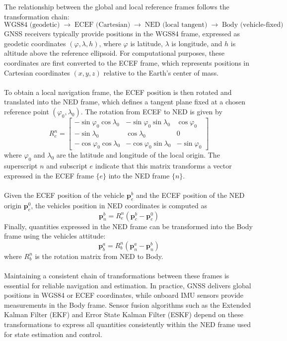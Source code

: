 \noindent
The relationship between the global and local reference frames follows the transformation chain:
$$
    \text{WGS84 (geodetic)} \;\rightarrow\; \text{ECEF (Cartesian)} \;\rightarrow\; \text{NED (local tangent)} \;\rightarrow\; \text{Body (vehicle-fixed)}
$$
GNSS receivers typically provide positions in the WGS84 frame, expressed as geodetic coordinates $(\varphi, \lambda, h)$, where $\varphi$ is latitude, $\lambda$ is longitude, and $h$ is altitude above the reference ellipsoid. For computational purposes, these coordinates are first converted to the ECEF frame, which represents positions in Cartesian coordinates $(x, y, z)$ relative to the Earth’s center of mass.  
\\ \\
To obtain a local navigation frame, the ECEF position is then rotated and translated into the NED frame, which defines a tangent plane fixed at a chosen reference point $(\varphi_0, \lambda_0)$. The rotation from ECEF to NED is given by
$$
    R_{e}^{n} =
    \begin{bmatrix}
        -\sin\varphi_0\cos\lambda_0 & -\sin\varphi_0\sin\lambda_0 & \cos\varphi_0 \\
        -\sin\lambda_0 & \cos\lambda_0 & 0 \\
        -\cos\varphi_0\cos\lambda_0 & -\cos\varphi_0\sin\lambda_0 & -\sin\varphi_0
    \end{bmatrix}
$$
where $\varphi_0$ and $\lambda_0$ are the latitude and longitude of the local origin. The superscript $n$ and subscript $e$ indicate that this matrix transforms a vector expressed in the ECEF frame $\{e\}$ into the NED frame $\{n\}$.  
\\ \\
Given the ECEF position of the vehicle $\mathbf{p}_e^b$ and the ECEF position of the NED origin $\mathbf{p}_e^0$, the vehicles position in NED coordinates is computed as
$$
    \mathbf{p}_n^b = R_e^n (\mathbf{p}_e^b - \mathbf{p}_e^0)
$$
Finally, quantities expressed in the NED frame can be transformed into the Body frame using the vehicles attitude:
$$
    \mathbf{p}_b^a = R_b^n (\mathbf{p}_n^a - \mathbf{p}_n^b)
$$
where $R_b^n$ is the rotation matrix from NED to Body.  
\\ \\
Maintaining a consistent chain of transformations between these frames is essential for reliable navigation and estimation. In practice, GNSS delivers global positions in WGS84 or ECEF coordinates, while onboard IMU sensors provide measurements in the Body frame. Sensor fusion algorithms such as the Extended Kalman Filter (EKF) and Error State Kalman Filter (ESKF) depend on these transformations to express all quantities consistently within the NED frame used for state estimation and control.
